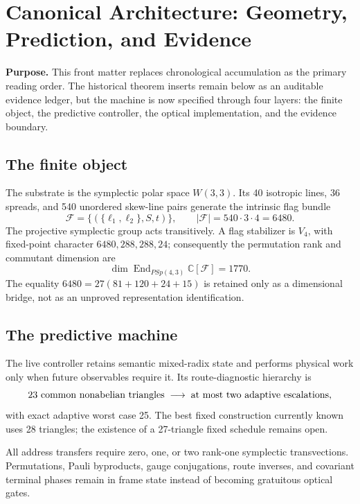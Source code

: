 \clearpage
\section*{Canonical Architecture: Geometry, Prediction, and Evidence}

\noindent\textbf{Purpose.}
This front matter replaces chronological accumulation as the primary reading order.
The historical theorem inserts remain below as an auditable evidence ledger, but the
machine is now specified through four layers: the finite object, the predictive
controller, the optical implementation, and the evidence boundary.

\subsection*{The finite object}
The substrate is the symplectic polar space \(W(3,3)\).  Its 40 isotropic lines,
36 spreads, and 540 unordered skew-line pairs generate the intrinsic flag bundle
\[
  \mathcal F
  =\{(\{\ell_1,\ell_2\},S,t)\},
  \qquad
  |\mathcal F|=540\cdot3\cdot4=6480.
\]
The projective symplectic group acts transitively.  A flag stabilizer is \(V_4\),
with fixed-point character \(6480,288,288,24\); consequently the permutation
rank and commutant dimension are
\[
  \dim\operatorname{End}_{PSp(4,3)}\mathbb C[\mathcal F]=1770.
\]
The equality \(6480=27(81+120+24+15)\) is retained only as a dimensional bridge,
not as an unproved representation identification.

\subsection*{The predictive machine}
The live controller retains semantic mixed-radix state and performs physical work only
when future observables require it.  Its route-diagnostic hierarchy is
\[
  23\ \hbox{common nonabelian triangles}
  \;\longrightarrow\;
  \hbox{at most two adaptive escalations},
\]
with exact adaptive worst case 25.  The best fixed construction currently known uses
28 triangles; the existence of a 27-triangle fixed schedule remains open.

All address transfers require zero, one, or two rank-one symplectic transvections.
Permutations, Pauli byproducts, gauge conjugations, route inverses, and covariant
terminal phases remain in frame state instead of becoming gratuitous optical gates.

